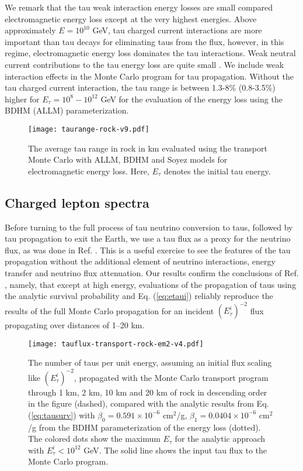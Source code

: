 \documentclass[aps,10pt,twocolumn,tightenlines]{revtex4-1}
\begin{document}
We remark that the
tau weak interaction energy losses are small compared electromagnetic energy loss except at the very highest 
energies. Above approximately $E=10^{10}$ GeV, tau charged current interactions are more important than tau
decays for eliminating taus from the flux, however, in this regime, electromagnetic energy loss dominates the
tau interactions. Weak neutral current contributions to the tau energy loss are quite small \cite{Kuzmin:2007zz}. We include
weak interaction effects in the Monte Carlo program for tau propagation. Without the tau charged current
interaction, the tau range is between 1.3-8\% (0.8-3.5\%) higher for $E_\tau=10^8-10^{12}$ GeV for the
evaluation of the energy loss using the BDHM (ALLM) parameterization. 
\begin{figure}[htb]
\centering
	\texttt{[image: taurange-rock-v9.pdf]}
	\caption{The average tau range in rock in km evaluated using the transport Monte Carlo with ALLM, BDHM and Soyez models for electromagnetic energy loss. Here, $E_\tau$ denotes the initial tau energy.}
	\label{fig:taurange}
\end{figure}

\subsection{Charged lepton spectra}

Before turning to the full process of tau neutrino conversion to taus, followed by tau propagation to exit the Earth,
we use a tau flux as a 
proxy for the neutrino flux, as was done in 
Ref. \cite{Bigas:2008ff}.  This is a useful exercise to see the features of the tau propagation without the additional element of neutrino interactions, energy transfer and neutrino flux attenuation. Our results confirm the conclusions of Ref. \cite{Dutta:2005yt,Bigas:2008ff}, namely,
that except at high energy, 
evaluations of the propagation of taus using the analytic survival probability and Eq. (\ref{eq:etaui}) reliably reproduce
the results of the full Monte Carlo propagation for an incident $(E_\tau^i)^{-2}$ flux propagating over distances of 1--20 km.

\begin{figure}[htb]
\centering
	\texttt{[image: tauflux-transport-rock-em2-v4.pdf]}
	\caption{The number of taus per unit energy, assuming an initial flux scaling like $(E_\tau^i)^{-2}$, propagated with the Monte Carlo transport program through
	1 km, 2 km, 10 km and 20 km of rock in descending order in the figure (dashed), compared with the analytic results from Eq. (\ref{eq:tausurv}) with
	$\beta_0=0.591\times 10^{-6}$ cm$^2$/g, $\beta_1=0.0404\times 10^{-6}$ cm$^2$/g from the BDHM parameterization of the energy loss (dotted). The colored dots show the maximum $E_\tau$ for the analytic approach with $E_\tau^i<10^{12}$ GeV. The solid line shows the input tau flux to the Monte Carlo program.}
\label{fig:taufluxem2}
\end{figure}
\end{document}
